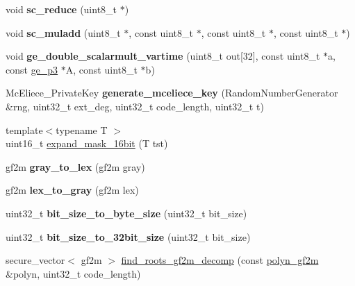 \begin{DoxyCompactItemize}
void {\bfseries sc\+\_\+reduce} (uint8\+\_\+t $\ast$)
\item 
\mbox{\label{namespace_botan_afbf5fb74f75f8e8a672618c5778882d8}} 
void {\bfseries sc\+\_\+muladd} (uint8\+\_\+t $\ast$, const uint8\+\_\+t $\ast$, const uint8\+\_\+t $\ast$, const uint8\+\_\+t $\ast$)
\item 
\mbox{\label{namespace_botan_abb0a91dc71fee53c2fee96871c7f7615}} 
void {\bfseries ge\+\_\+double\+\_\+scalarmult\+\_\+vartime} (uint8\+\_\+t out\mbox{[}32\mbox{]}, const uint8\+\_\+t $\ast$a, const \mbox{\hyperlink{struct_botan_1_1ge__p3}{ge\+\_\+p3}} $\ast$A, const uint8\+\_\+t $\ast$b)
\item 
\mbox{\label{namespace_botan_a00a00d178520dc81df3cc56aeb05c090}} 
Mc\+Eliece\+\_\+\+Private\+Key {\bfseries generate\+\_\+mceliece\+\_\+key} (Random\+Number\+Generator \&rng, uint32\+\_\+t ext\+\_\+deg, uint32\+\_\+t code\+\_\+length, uint32\+\_\+t t)
\item 
{\footnotesize template$<$typename T $>$ }\\uint16\+\_\+t \mbox{\hyperlink{namespace_botan_a2a0b6b61c8483eb1efca4564bb144828}{expand\+\_\+mask\+\_\+16bit}} (T tst)
\item 
\mbox{\label{namespace_botan_a8a034f6ffbedf7c310fb4de5babe0e2f}} 
gf2m {\bfseries gray\+\_\+to\+\_\+lex} (gf2m gray)
\item 
\mbox{\label{namespace_botan_a0f805af14a8443cddfb254ff07410ac3}} 
gf2m {\bfseries lex\+\_\+to\+\_\+gray} (gf2m lex)
\item 
\mbox{\label{namespace_botan_a511ec83b0f8c9a684ca5b486626714e9}} 
uint32\+\_\+t {\bfseries bit\+\_\+size\+\_\+to\+\_\+byte\+\_\+size} (uint32\+\_\+t bit\+\_\+size)
\item 
\mbox{\label{namespace_botan_a21d097bb936f18978fac8f201b9445ad}} 
uint32\+\_\+t {\bfseries bit\+\_\+size\+\_\+to\+\_\+32bit\+\_\+size} (uint32\+\_\+t bit\+\_\+size)
\item 
secure\+\_\+vector$<$ gf2m $>$ \mbox{\hyperlink{namespace_botan_a664573e9a1043c872e3d0c03d4d9f2ec}{find\+\_\+roots\+\_\+gf2m\+\_\+decomp}} (const \mbox{\hyperlink{class_botan_1_1polyn__gf2m}{polyn\+\_\+gf2m}} \&polyn, uint32\+\_\+t code\+\_\+length)

\end{DoxyCompactItemize}
